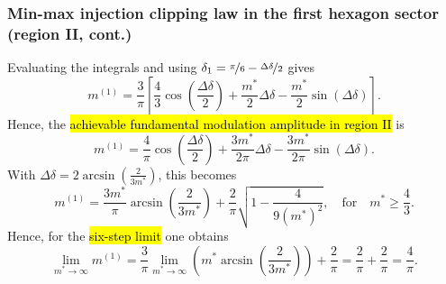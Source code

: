 \begin{frame}
    \frametitle{Min-max injection clipping law in the first hexagon sector (region II, cont.)}
    Evaluating the integrals and using $\delta_1 = \nicefrac{\pi}{6} - \nicefrac{\Delta\delta}{2}$ gives
    \begin{equation}
        m^{(1)} = \frac{3}{\pi}\left[\frac{4}{3}\cos\!\left(\frac{\Delta\delta}{2}\right) + \frac{m^*}{2}\Delta\delta - \frac{m^*}{2}\sin\!\left(\Delta\delta\right)\right].
    \end{equation}\pause
    Hence, the \hl{achievable fundamental modulation amplitude in region II} is
    \begin{equation}
        m^{(1)} = \frac{4}{\pi}\cos\!\left(\frac{\Delta\delta}{2}\right) + \frac{3m^*}{2\pi}\Delta\delta - \frac{3m^*}{2\pi}\sin\!\left(\Delta\delta\right).
    \end{equation}\pause
    With $\Delta\delta = 2\arcsin\!\left(\frac{2}{3m^*}\right)$, this becomes
    \begin{equation}
        m^{(1)} = \frac{3m^*}{\pi}\arcsin\!\left(\frac{2}{3m^*}\right) + \frac{2}{\pi}\sqrt{1-\frac{4}{9(m^*)^2}}, \quad \text{for} \quad m^* \geq \frac{4}{3}.
    \end{equation}\pause
    Hence, for the \hl{six-step limit} one obtains
    \begin{equation}
        \lim_{m^*\to\infty} m^{(1)} = \frac{3}{\pi}\lim_{m^*\to\infty}\left(m^*\arcsin\!\left(\frac{2}{3m^*}\right)\right) + \frac{2}{\pi} = \frac{2}{\pi} + \frac{2}{\pi} = \frac{4}{\pi}.
    \end{equation}
\end{frame}

